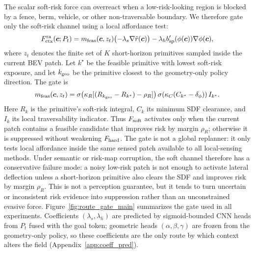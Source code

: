 The scalar soft-risk force can overreact when a low-risk-looking region is
blocked by a fence, berm, vehicle, or other non-traversable boundary.  We
therefore gate only the soft-risk channel using a local affordance test:
\begin{equation}
F_{\rm ctx}^{\rm ra}(\vec c;P_t)
=
m_{\rm feas}(\vec c,z_t)\bigl(-\lambda_s\nabla\tilde r(\vec c)\bigr)
-
\lambda_h b_{\rm sp}'(\phi(\vec c))\nabla\phi(\vec c),
\label{eq:method:route_aware_force}
\end{equation}
where $z_t$ denotes the finite set of $K$ short-horizon primitives sampled
inside the current BEV patch.  Let $k^\star$ be the feasible primitive with
lowest soft-risk exposure, and let $k_{\rm geo}$ be the primitive closest to
the geometry-only policy direction.  The gate is
\begin{equation}
m_{\rm feas}(\vec c,z_t)
=
\sigma\!\left(\kappa_R[(R_{k_{\rm geo}}-R_{k^\star})-\rho_R]\right)
\sigma\!\left(\kappa_C(C_{k^\star}-\delta_\phi)\right)
I_{k^\star}.
\label{eq:method:route_gate}
\end{equation}
Here $R_k$ is the primitive's soft-risk integral, $C_k$ its minimum SDF
clearance, and $I_k$ its local traversability indicator.  Thus
$F_{\rm soft}$ activates only when the current patch contains a feasible
candidate that improves risk by margin $\rho_R$; otherwise it is suppressed
without weakening $F_{\rm hard}$.  The gate is not a global replanner: it only
tests local affordance inside the same sensed patch available to all
local-sensing methods. Under semantic or risk-map corruption, the soft channel
therefore has a conservative failure mode: a noisy low-risk patch is not enough
to activate lateral deflection unless a short-horizon primitive also clears the
SDF and improves risk by margin $\rho_R$. This is not a perception guarantee,
but it tends to turn uncertain or inconsistent risk evidence into suppression
rather than an unconstrained evasive force.  Figure~\ref{fig:route_gate_main}
summarizes the gate used in all experiments.  Coefficients $(\lambda_s,\lambda_h)$ are predicted
by sigmoid-bounded CNN heads from $P_t$ fused with the goal token; geometric
heads $(\alpha,\beta,\gamma)$ are frozen from the geometry-only policy, so these coefficients
are the only route by which context alters the field
(Appendix~\ref{app:coeff_pred}).


